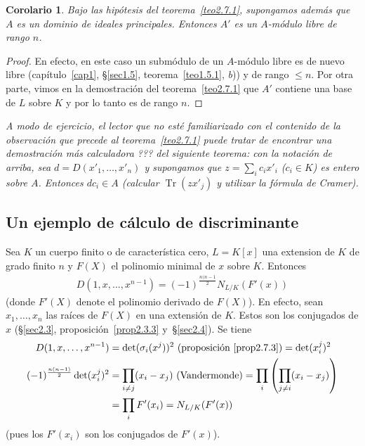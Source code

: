 \documentclass[10pt,oneside,bibtotoc,smallheadings,leqno,a5paper,DIV=12]{scrbook}
\DeclareMathOperator{\Tr}{Tr}
\numberwithin{equation}{section}
\newenvironment{comm}%
	{\begin{trivlist}\item\small\itshape}
	{\end{trivlist}}
\theoremstyle{defi}
\theoremstyle{enonce}
\newtheorem*{corollary*}{Corolario}
\theoremstyle{rem}
\numberwithin{theorem}{section}
\numberwithin{proposition}{section}
\numberwithin{definition}{section}
\numberwithin{lemma}{section}
\numberwithin{corollary}{section}
\numberwithin{example}{section}
\numberwithin{footnote}{section}%
\begin{document}
\begin{corollary*}
Bajo las hip\'otesis del teorema~\ref{teo2.7.1}, supongamos adem\'as que $A$ es un dominio de ideales principales. Entonces
$A'$ es un $A$-m\'odulo libre de rango $n$.
\end{corollary*}

\begin{proof}
En efecto, en este caso un subm\'odulo de un $A$-m\'odulo libre es de nuevo libre
(cap\'itulo~\ref{cap1}, \S\ref{sec1.5}, teorema~\ref{teo1.5.1}, {\itshape b}))
y de rango $\leq n$. Por otra parte, vimos en la demostraci\'on del teorema~\ref{teo2.7.1} que $A'$ contiene una base de $L$ sobre
$K$ y por lo tanto es de rango $n$.
\end{proof}

\begin{comm}
A modo de ejercicio, el lector que no est\'e familiarizado con el contenido de la observaci\'on que
precede al teorema~\ref{teo2.7.1} puede tratar de encontrar una demostraci\'on m\'as calculadora ??? del siguiente teorema:
con la notaci\'on de arriba, sea $d = D(x'_{1},\dots,x'_{n})$ y supongamos que $z = \sum_{i}c_{i}x'_{i}$
($c_{i}\in K$) es entero sobre $A$. Entonces $dc_{i}\in A$ (calcular $\Tr(zx'_{j})$ y utilizar la f\'ormula de
Cramer).
\end{comm}

\subsection*{Un ejemplo de c\'alculo de discriminante}

Sea $K$ un cuerpo finito o de caracter\'istica cero, $L = K[x]$ una extension de $K$ de grado finito $n$ y
$F(X)$ el polinomio minimal de $x$ sobre $K$. Entonces
\begin{gather}\label{eq2.7.6}
D(1,x,\dots,x^{n-1})=(-1)^{\frac{n(n-1}{2}}N_{L/K}(F'(x))
\end{gather}
(donde $F'(X)$ denote el polinomio derivado de $F(X)$). En efecto, sean $x_{1},\dots,x_{n}$ las ra\'ices de
$F(X)$ en una extensi\'on de $K$. Estos son los conjugados de $x$
(\S\ref{sec2.3}, proposici\'on~\ref{prop2.3.3} y~\S\ref{sec2.4}). Se tiene
\begin{align*}
D(1,x,\dots,x^{n-1}) &= \det(\sigma_{i}(x^{j}))^{2}\text{ (proposici\'on~\ref{prop2.7.3})} = \det(x_{i}^{j})^{2}\\
(-1)^{\frac{n(n-1)}{2}}\det(x_{i}^{j})^{2} &= \prod_{i\neq j}(x_{i}-x_{j})\text{ (Vandermonde)} =
\prod_{i}\left(\prod_{j\neq i}(x_{i}-x_{j})\right)\\
&=\prod_{i}F'(x_{i}) = N_{L/K}(F'(x))
\end{align*}
(pues los $F'(x_{i})$ son los conjugados de $F'(x)$).
\end{document}
